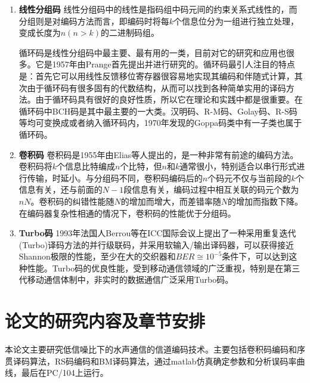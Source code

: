 \begin{enumerate}
  \item \textbf{线性分组码}\quad
    线性分组码中的线性是指码组中码元间的约束关系式线性的，而分组则是对编码方法而言，即编码时将每$k$个信息位分为一组进行独立处理，变成长度为$n(n>k)$的二进制码组。

循环码是线性分组码中最主要、最有用的一类，目前对它的研究和应用也很多。它是1957年由Prange首先提出并进行研究的。循环码最引人注目的特点是：首先它可以用线性反馈移位寄存器很容易地实现其编码和伴随式计算，其次由于循环码有很多固有的代数结构，从而可以找到各种简单实用的译码方法。由于循环码具有很好的良好性质，所以它在理论和实践中都是很重要。在循环码中BCH码是其中最主要的一大类。汉明码、R-M码、Golay码、R-S码等均可变换成或者纳入循环码内，1970年发现的Goppa码类中有一子类也属于循环码。
\item \textbf{卷积码}\quad
  卷积码是1955年由Elias等人提出的，是一种非常有前途的编码方法。卷积码将$k$个信息比特编成$n$个比特，但$n$和$k$通常很小，特别适合以串行形式进行传输，时延小。与分组码不同，卷积码编码后的$n$个码元不仅与当前段的$k$个信息有关，还与前面的$N-1$段信息有关，编码过程中相互关联的码元个数为$nN$。卷积码的纠错性能随$N$的增加而增大，而差错率随$N$的增加而指数下降。在编码器复杂性相通的情况下，卷积码的性能优于分组码。
\item \textbf{Turbo码}\quad
  1993年法国人Berrou等在ICC国际会议上提出了一种采用重复迭代(Turbo)译码方法的并行级联码，并采用软输入/输出译码器，可以获得接近Shannon极限的性能，至少在大的交织器和$BER\cong 10^{-5}$条件下，可以达到这种性能。Turbo码的优良性能，受到移动通信领域的广泛重视，特别是在第三代移动通信体制中，非实时的数据通信广泛采用Turbo码。
\end{enumerate}
\section{论文的研究内容及章节安排}
本论文主要研究低信噪比下的水声通信的信道编码技术。主要包括卷积码编码和序贯译码算法，RS码编码和BM译码算法，通过matlab仿真确定参数和分析误码率曲线，最后在PC/104上运行。

